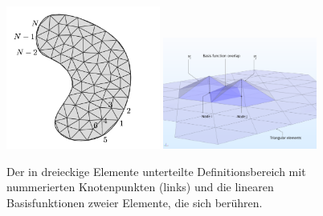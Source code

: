 %
%
%
\begin{figure}
    \centering
    \includegraphics[width=0.45\textwidth]{papers/fem/images/2d_mesh.png}
    \includegraphics[width=0.45\textwidth]{papers/fem/images/2d_basisfkt.png}
    \caption{Der in dreieckige Elemente unterteilte Definitionsbereich mit nummerierten Knotenpunkten (links) und die linearen Basisfunktionen zweier Elemente, die sich berühren.}
    \label{fem:nd:2d_mesh_und_basisfkt}
    \end{figure}
    